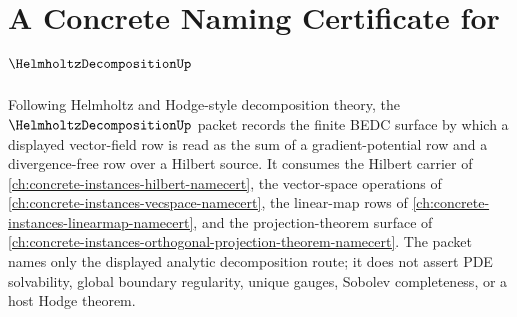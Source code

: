 \chapter{A Concrete Naming Certificate for $\HelmholtzDecompositionUp$}
\label{ch:concrete-instances-helmholtz-decomposition-namecert}

Following Helmholtz and Hodge-style decomposition theory, the $\HelmholtzDecompositionUp$ packet records the finite BEDC surface by which a displayed vector-field row is read as the sum of a gradient-potential row and a divergence-free row over a Hilbert source. It consumes the Hilbert carrier of \autoref{ch:concrete-instances-hilbert-namecert}, the vector-space operations of \autoref{ch:concrete-instances-vecspace-namecert}, the linear-map rows of \autoref{ch:concrete-instances-linearmap-namecert}, and the projection-theorem surface of \autoref{ch:concrete-instances-orthogonal-projection-theorem-namecert}. The packet names only the displayed analytic decomposition route; it does not assert PDE solvability, global boundary regularity, unique gauges, Sobolev completeness, or a host Hodge theorem.

